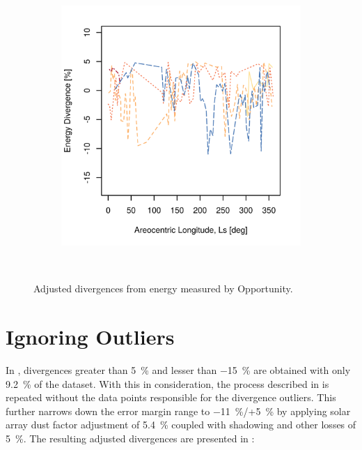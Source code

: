 \begin{figure}[h]
\begin{subfigure}[t]{\subfigureWidth}
            \includegraphics[height=\graphicsHeight]{sections/appendix/energy-error-margin/plots/energy-prediction-divergences-from-my28-to-my32-adjusted-without-outliers.png}
            \label{fig:plot:mer-energy-prediction-divergences-adjusted-without-outliers}
    \end{subfigure}\\[0.8ex]
    \caption[Adjusted divergences from energy measured by Opportunity]
    {Adjusted divergences from energy measured by Opportunity.}
    \label{fig:plot:mer-energy-prediction-divergences-adjusted}
\vspace{-2ex}
\end{figure}



\section{Ignoring Outliers}
\label{sec:Appendix:NarrowedEnergyPredictionErrorMarginRange:IgnoringOutliers}

In , divergences greater than \SI{5}{\percent} and lesser than \SI{-15}{\percent} are obtained with only \SI{9.2}{\percent} of the dataset. With this in consideration, the process described in  is repeated without the data points responsible for the divergence outliers. This further narrows down the error margin range to \SI{-11}{\percent}/+\SI{5}{\percent} by applying solar array dust factor adjustment of \SI{5.4}{\percent} coupled with shadowing and other losses of \SI{5}{\percent}. The resulting adjusted divergences are presented in :


